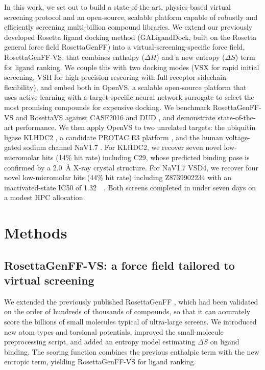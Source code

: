 \documentclass[11pt]{article}
\begin{document}
In this work, we set out to build a state-of-the-art, physics-based virtual screening protocol and an open-source, scalable platform capable of robustly and efficiently screening multi-billion compound libraries. We extend our previously developed Rosetta ligand docking method (GALigandDock, built on the Rosetta general force field RosettaGenFF) \citep{park2021simultaneous} into a virtual-screening-specific force field, RosettaGenFF-VS, that combines enthalpy (\(\Delta H\)) and a new entropy (\(\Delta S\)) term for ligand ranking. We couple this with two docking modes (VSX for rapid initial screening, VSH for high-precision rescoring with full receptor sidechain flexibility), and embed both in OpenVS, a scalable open-source platform that uses active learning with a target-specific neural network surrogate to select the most promising compounds for expensive docking. We benchmark RosettaGenFF-VS and RosettaVS against CASF2016 \citep{su2019casf2016,li2018casf2016comprehensive} and DUD \citep{huang2006dud}, and demonstrate state-of-the-art performance. We then apply OpenVS to two unrelated targets: the ubiquitin ligase KLHDC2 \citep{rusnac2018recognition,scott2020structural}, a candidate PROTAC E3 platform \citep{wurz2018klhdc2,hanzl2020targetedPROTAC}, and the human voltage-gated sodium channel NaV1.7 \citep{dib2005nav17,ahuja2015structural,xu2019structural,li2021structural,ahern2016electrophysiology}. For KLHDC2, we recover seven novel low-micromolar hits (14\% hit rate) including C29, whose predicted binding pose is confirmed by a 2.0~\AA{} X-ray crystal structure. For NaV1.7 VSD4, we recover four novel low-micromolar hits (44\% hit rate) including Z8739902234 with an inactivated-state IC50 of 1.32~\si{\micro\molar}. Both screens completed in under seven days on a modest HPC allocation.

\section{Methods}
\subsection{RosettaGenFF-VS: a force field tailored to virtual screening}
We extended the previously published RosettaGenFF \citep{park2021simultaneous}, which had been validated on the order of hundreds of thousands of compounds, so that it can accurately score the billions of small molecules typical of ultra-large screens. We introduced new atom types and torsional potentials, improved the small-molecule preprocessing script, and added an entropy model estimating \(\Delta S\) on ligand binding. The scoring function combines the previous enthalpic term with the new entropic term, yielding RosettaGenFF-VS for ligand ranking.
\end{document}
